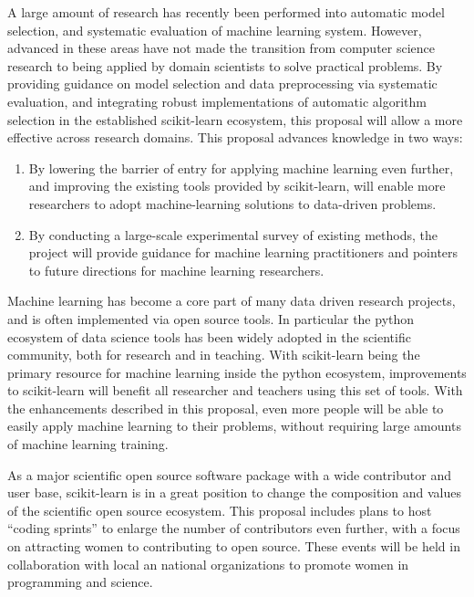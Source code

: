 A large amount of research has recently been performed into automatic model
selection, and systematic evaluation of machine learning system.
However, advanced in these areas have not made the transition from computer
science research to being applied by domain scientists to solve practical
problems.
By providing guidance on model selection and data preprocessing via
systematic evaluation, and integrating robust implementations of automatic
algorithm selection in the established scikit-learn ecosystem, this proposal
will allow a more effective  across research domains.
%
\vspace{-2mm}
\vspace{-2mm}
This proposal advances knowledge in two ways:
\begin{enumerate}
    \item By lowering the barrier of entry for applying machine learning even further,
    and improving the existing tools provided by scikit-learn, will enable more
    researchers to adopt machine-learning solutions to data-driven problems.
    \item By conducting a large-scale experimental survey of existing methods,
    the project will provide guidance for machine learning practitioners
    and pointers to future directions for machine learning researchers.
\end{enumerate}
%
\vspace{-6mm}
\vspace{-2mm}
Machine learning has become a core part of many data driven research projects,
and is often implemented via open source tools.
In particular the python ecosystem of data science tools has been widely
adopted in the scientific community, both for research and in teaching.
With scikit-learn being the primary resource for machine learning inside
the python ecosystem, improvements to scikit-learn will benefit all researcher
and teachers using this set of tools.
With the enhancements described in this proposal, even more people
will be able to easily apply machine learning to their problems,
without requiring large amounts of machine learning training.

As a major scientific open source software package with a wide contributor
and user base, scikit-learn is in a great position to change
the composition and values of the scientific open source ecosystem.
This proposal includes plans to host ``coding sprints'' to enlarge the number
of contributors even further, with a focus on attracting women to contributing
to open source. These events will be held in collaboration with local an
national organizations to promote women in programming and science.
